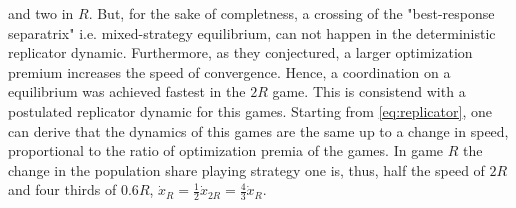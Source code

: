 \documentclass[11pt]{article}
\begin{document}
and two in $R$.
But, for the sake of completness, a crossing of the  
"best-response separatrix" \parencite{battalio_optimization_2001} i.e. 
mixed-strategy equilibrium, can not happen in the deterministic replicator 
dynamic.
Furthermore, as they conjectured, a larger
optimization premium increases the speed of convergence. Hence, a coordination
on a equilibrium was achieved fastest in the $2R$ game. 
This is consistend with a postulated replicator dynamic for this games. 
Starting from \eqref{eq:replicator}, one can derive that the dynamics of this 
games are the same up to a change in speed, proportional to the ratio of 
optimization premia of the games. In game $R$ the change in the population share
playing strategy one is, thus, half the speed of $2R$ and four thirds of $0.6R$,
$\dot{x}_{R} = \frac 12 \dot{x}_{2R} = \frac{4}{3}\dot{x}_R$.
\end{document}
